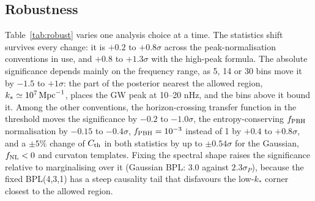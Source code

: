 \documentclass[a4paper,11pt]{article}
\newcommand{\fnl}{f_{\rm NL}}
\newcommand{\fpbh}{f_{\rm PBH}}
\begin{document}
\subsection{Robustness}\label{sec:robust}

Table~\ref{tab:robust} varies one analysis choice at a time. The statistics shift survives every
change: it is $+0.2$ to $+0.8\sigma$ across the peak-normalisation conventions in use, and $+0.8$
to $+1.3\sigma$ with the high-peak formula. The absolute significance depends mainly on the
frequency range, as 5, 14 or 30 bins move it by $-1.5$ to $+1\sigma$: the part of the posterior
nearest the allowed region, $k_*\simeq10^7\,{\rm Mpc}^{-1}$, places the GW peak at 10--20 nHz, and
the bins above it bound it. Among the other conventions, the horizon-crossing transfer function in
the threshold moves the significance by $-0.2$ to $-1.0\sigma$, the entropy-conserving $\fpbh$
normalisation by $-0.15$ to $-0.4\sigma$, $\fpbh=10^{-3}$ instead of 1 by $+0.4$ to $+0.8\sigma$,
and a $\pm5\%$ change of $C_{\rm th}$ in both statistics by up to $\pm0.54\sigma$ for the Gaussian,
$\fnl<0$ and curvaton templates. Fixing the spectral shape raises the significance relative to
marginalising over it (Gaussian BPL: $3.0$ against $2.3\sigma_P$), because the fixed BPL(4,3,1)
has a steep causality tail that disfavours the low-$k_*$ corner closest to the allowed region.
\end{document}

